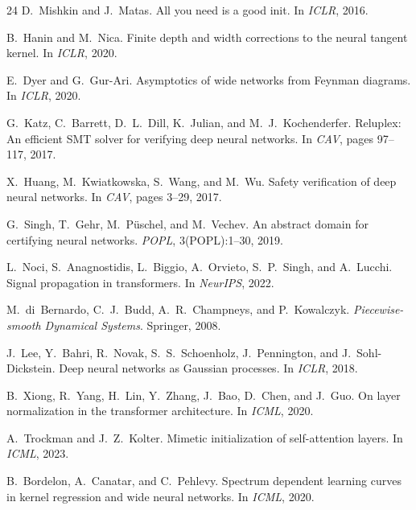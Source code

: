 \documentclass[10pt]{article}
\begin{document}
\begin{thebibliography}{24}
D.~Mishkin and J.~Matas.
\newblock All you need is a good init.
\newblock In \emph{ICLR}, 2016.

B.~Hanin and M.~Nica.
\newblock Finite depth and width corrections to the neural tangent kernel.
\newblock In \emph{ICLR}, 2020.

E.~Dyer and G.~Gur-Ari.
\newblock Asymptotics of wide networks from {F}eynman diagrams.
\newblock In \emph{ICLR}, 2020.

G.~Katz, C.~Barrett, D.~L.~Dill, K.~Julian, and M.~J.~Kochenderfer.
\newblock Reluplex: An efficient {SMT} solver for verifying deep neural networks.
\newblock In \emph{CAV}, pages 97--117, 2017.

X.~Huang, M.~Kwiatkowska, S.~Wang, and M.~Wu.
\newblock Safety verification of deep neural networks.
\newblock In \emph{CAV}, pages 3--29, 2017.

G.~Singh, T.~Gehr, M.~P{\"u}schel, and M.~Vechev.
\newblock An abstract domain for certifying neural networks.
\newblock \emph{POPL}, 3(POPL):1--30, 2019.

L.~Noci, S.~Anagnostidis, L.~Biggio, A.~Orvieto, S.~P.~Singh, and A.~Lucchi.
\newblock Signal propagation in transformers.
\newblock In \emph{NeurIPS}, 2022.

M.~di~Bernardo, C.~J.~Budd, A.~R.~Champneys, and P.~Kowalczyk.
\newblock \emph{Piecewise-smooth Dynamical Systems}.
\newblock Springer, 2008.

J.~Lee, Y.~Bahri, R.~Novak, S.~S.~Schoenholz, J.~Pennington, and J.~Sohl-Dickstein.
\newblock Deep neural networks as {G}aussian processes.
\newblock In \emph{ICLR}, 2018.

B.~Xiong, R.~Yang, H.~Lin, Y.~Zhang, J.~Bao, D.~Chen, and J.~Guo.
\newblock On layer normalization in the transformer architecture.
\newblock In \emph{ICML}, 2020.

A.~Trockman and J.~Z.~Kolter.
\newblock Mimetic initialization of self-attention layers.
\newblock In \emph{ICML}, 2023.

B.~Bordelon, A.~Canatar, and C.~Pehlevy.
\newblock Spectrum dependent learning curves in kernel regression and wide neural networks.
\newblock In \emph{ICML}, 2020.

\end{thebibliography}
\end{document}
